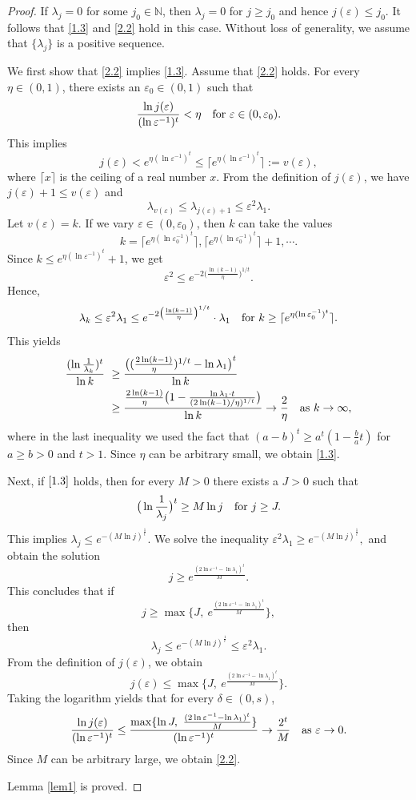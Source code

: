 \documentclass{amsart}
\numberwithin{equation}{section}
\def\vz{\varepsilon}
\def\lz{\lambda}
\newcommand{\NN}{\mathbb{N}}
\def\NN{{\mathbb N}}
\begin{document}
\begin{proof}If $\lz_{j}=0$ for
some $j_0\in\NN$, then $\lambda_j=0$ for $j\ge j_0$ and hence
$j(\vz)\le j_0$. It follows that \eqref{1.3} and \eqref{2.2} hold in this case. Without loss of generality, we
assume that $\{\lz_j\}$ is a positive sequence.

We first show that \eqref{2.2} implies \eqref{1.3}. Assume that
\eqref{2.2} holds. For every $\eta\in(0,1)$, there exists an
$\vz_0\in(0,1)$ such that
$$\frac{\ln j(\vz)}{(\ln \vz^{-1})^t}<\eta  \ \ \ {\rm for}\  \vz\in(0,\vz_0).$$
This implies
$$j(\vz)<e^{\eta (\ln\vz^{-1})^t} \le \lceil e^{\eta (\ln\vz^{-1})^t}\rceil :=v(\vz),$$
where $\lceil x\rceil$  is the ceiling of a real number $x$.  From the definition of $j(\vz)$, we
have $j(\vz)+1\le v(\vz)$ and
$$\lambda_{v(\vz)}\le \lambda_{j(\vz)+1}\le \vz^2\lz_1.$$
Let $v(\vz)=k$. If we vary $\vz\in(0,\vz_0)$, then $k$ can take the
values
$$k= \lceil e^{\eta (\ln\vz_0^{-1})^t} \rceil,\lceil e^{\eta (\ln\vz_0^{-1})^t}\rceil+1,\cdots.$$
Since $k\le e^{\eta (\ln\vz^{-1})^t}+1$, we get
$$\vz^{2}\le e^{-2\big(\frac{\ln (k-1)}{\eta}\big)^{1/t}}.$$
Hence, $$\lambda_{k}\le \vz^2\lz_1\le  e^{-2\big(\frac{\ln
(k-1)}{\eta}\big)^{1/t}}\cdot\lz_1\ \  \ {\rm for}\  k\ge \lceil
e^{\eta (\ln\vz_0^{-1})^t}\rceil. $$  This  yields
  \begin{align*}\frac{(\ln\frac{1}{\lambda_{k}})^t}{\ln k}\
  &\ge\frac{\big((\frac{ 2\ln(k-1)}{\eta})^{1/t}-\ln\lz_1\big)^t}{\ln k}\\&\ge
  \frac{\frac{2\ln(k-1)}{\eta}\big(1-\frac{\ln \lz_1\cdot t}{(2 \ln(k-1)/\eta)^{1/t}}\big)}{\ln k}\to \frac{2}{\eta}
  \ \ \ {\rm as \ }k\to\infty,\end{align*}where in
  the last inequality we used the fact that
$(a-b)^t\ge a^t(1-\frac{b}{a}t)$ for $a\ge b> 0$ and $t>1$. Since $\eta$ can be arbitrary small, we obtain \eqref{1.3}.

Next, if $\eqref{1.3}$ holds, then for every $M>0$ there exists a
$J>0$ such that
$$\big(\ln\frac{1}{\lambda_j}\big)^t\geq M\ln j \ \ \ {\rm for}\ j\geq J.$$
This implies $\lambda_j\le e^{-(M\ln j)^{\frac{1}{t}}}$. We solve
the inequality $\vz^2\lz_1\ge  e^{-(M\ln j)^{\frac{1}{t}}},$ and obtain the solution
$$j\ge e^{\frac{(2\ln\vz^{-1}-\ln\lz_1)^t}{M}}.$$
This concludes that if $$j\ge \max\{J,\
e^{\frac{(2\ln\vz^{-1}-\ln\lz_1)^t}{M}}\},$$ then $$\lz_j\le
e^{-(M\ln j)^{\frac{1}{t}}}\le \vz^2\lz_1.$$
 From the definition of $j(\vz)$, we obtain
$$j(\vz)\le \max\{J,\  e^{\frac{(2\ln\vz^{-1}-\ln\lz_1)^t}{M}}\}.$$
Taking the logarithm yields that for every $\delta\in(0,s)$,
$$\frac{\ln j(\vz)}{(\ln \vz^{-1})^t}\le \frac{\max\{\ln J,\ \frac{(2\ln\vz^{-1}-\ln\lz_1)^t}{M}\}}{(\ln \vz^{-1})^t}\to
\frac{2^t}M
  \ \ \ {\rm as \ }\vz\to 0.$$
Since $M$ can be arbitrary large, we obtain \eqref{2.2}.

Lemma \ref{lem1} is proved.
\end{proof}
\end{document}
